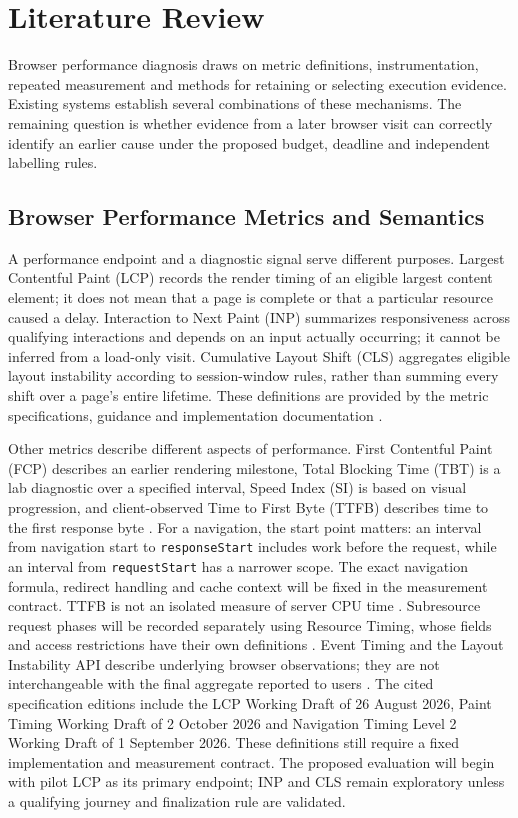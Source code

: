 \chapter{Literature Review}
\label{chap:literature-review}

Browser performance diagnosis draws on metric definitions, instrumentation, repeated measurement and methods for retaining or selecting execution evidence. Existing systems establish several combinations of these mechanisms. The remaining question is whether evidence from a later browser visit can correctly identify an earlier cause under the proposed budget, deadline and independent labelling rules.

\section{Browser Performance Metrics and Semantics}

A performance endpoint and a diagnostic signal serve different purposes. Largest Contentful Paint (LCP) records the render timing of an eligible largest content element; it does not mean that a page is complete or that a particular resource caused a delay. Interaction to Next Paint (INP) summarizes responsiveness across qualifying interactions and depends on an input actually occurring; it cannot be inferred from a load-only visit. Cumulative Layout Shift (CLS) aggregates eligible layout instability according to session-window rules, rather than summing every shift over a page's entire lifetime. These definitions are provided by the metric specifications, guidance and implementation documentation \parencite{6WVYFE8R,B8XNKSHY,R2U9EAFA,GYN22PP7,N33VTKAN}.

Other metrics describe different aspects of performance. First Contentful Paint (FCP) describes an earlier rendering milestone, Total Blocking Time (TBT) is a lab diagnostic over a specified interval, Speed Index (SI) is based on visual progression, and client-observed Time to First Byte (TTFB) describes time to the first response byte \parencite{84ZFNR74,QHUCFVBF,A8GDSSI7,JJWRMF5Z}. For a navigation, the start point matters: an interval from navigation start to \texttt{responseStart} includes work before the request, while an interval from \texttt{requestStart} has a narrower scope. The exact navigation formula, redirect handling and cache context will be fixed in the measurement contract. TTFB is not an isolated measure of server CPU time \parencite{JJWRMF5Z,9V33RJH6}. Subresource request phases will be recorded separately using Resource Timing, whose fields and access restrictions have their own definitions \parencite{NXHCE5SV}. Event Timing and the Layout Instability API describe underlying browser observations; they are not interchangeable with the final aggregate reported to users \parencite{I8L7FN9V,R2U9EAFA}. The cited specification editions include the LCP Working Draft of 26 August 2026, Paint Timing Working Draft of 2 October 2026 and Navigation Timing Level 2 Working Draft of 1 September 2026. These definitions still require a fixed implementation and measurement contract. The proposed evaluation will begin with pilot LCP as its primary endpoint; INP and CLS remain exploratory unless a qualifying journey and finalization rule are validated.

